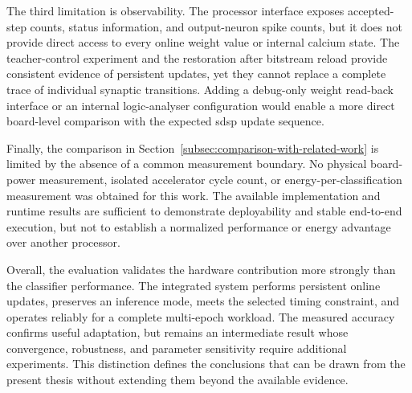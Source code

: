 The third limitation is observability. The processor interface exposes accepted-step counts, status information, and output-neuron spike counts, but it does not provide direct access to every online weight value or internal calcium state. The teacher-control experiment and the restoration after bitstream reload provide consistent evidence of persistent updates, yet they cannot replace a complete trace of individual synaptic transitions. Adding a debug-only weight read-back interface or an internal logic-analyser configuration would enable a more direct board-level comparison with the expected \gls{sdsp} update sequence.

Finally, the comparison in Section~\ref{subsec:comparison-with-related-work} is limited by the absence of a common measurement boundary. No physical board-power measurement, isolated accelerator cycle count, or energy-per-classification measurement was obtained for this work. The available implementation and runtime results are sufficient to demonstrate deployability and stable end-to-end execution, but not to establish a normalized performance or energy advantage over another processor.

Overall, the evaluation validates the hardware contribution more strongly than the classifier performance. The integrated system performs persistent online updates, preserves an inference mode, meets the selected timing constraint, and operates reliably for a complete multi-epoch workload. The measured accuracy confirms useful adaptation, but remains an intermediate result whose convergence, robustness, and parameter sensitivity require additional experiments. This distinction defines the conclusions that can be drawn from the present thesis without extending them beyond the available evidence.
